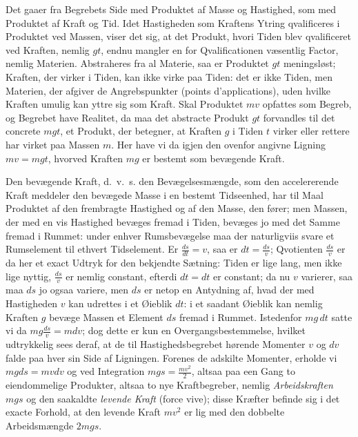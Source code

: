 \documentclass[12pt]{book}
\newcommand{\opage}[1]{\marginnote{\footnotesize\textit{[#1]}}}
\begin{document}
Det gaaer fra Begrebets Side med Produktet af Masse og Hastighed, som med Produktet af
Kraft og Tid. Idet Hastigheden som Kraftens Ytring qvalificeres i Produktet ved Massen,
viser det sig, at det Produkt, hvori Tiden blev
\opage{352} qvalificeret ved Kraften, nemlig $gt$, endnu mangler en for Qvalificationen væsentlig
Factor, nemlig Materien. Abstraheres fra al Materie, saa er Produktet $gt$ meningsløst;
Kraften, der virker i Tiden, kan ikke virke paa Tiden: det er ikke Tiden, men Materien,
der afgiver de Angrebspunkter (points d'applications), uden hvilke Kraften umulig kan
yttre sig som Kraft. Skal Produktet $mv$ opfattes som Begreb, og Begrebet have Realitet,
da maa det abstracte Produkt $gt$ forvandles til det concrete $mgt$, et Produkt, der
betegner, at Kraften $g$ i Tiden $t$ virker eller rettere har virket paa Massen $m$. Her
have vi da igjen den ovenfor angivne Ligning $mv = mgt$, hvorved Kraften $mg$ er bestemt
som bevægende Kraft.

Den bevægende Kraft, d.\ v.\ s. den Bevægelsesmængde, som den accelererende Kraft meddeler
den bevægede Masse i en bestemt Tidseenhed, har til Maal Produktet af den frembragte
Hastighed og af den Masse, den fører; men Massen, der med en vis Hastighed bevæges fremad
i Tiden, bevæges jo med det Samme fremad i Rummet: under enhver Rumsbevægelse maa der
naturligviis svare et Rumselement til ethvert Tidselement. Er $\frac{ds}{dt} = v$, saa er
$dt = \frac{ds}{v}$; Qvotienten $\frac{ds}{v}$ er da her et exact Udtryk for den bekjendte
Sætning: Tiden er lige lang, men ikke lige nyttig, $\frac{ds}{v}$ er nemlig constant,
efterdi $dt = dt$ er constant; da nu $v$ varierer, saa maa $ds$ jo ogsaa variere, men $ds$
er netop en Antydning af, hvad der med Hastigheden $v$ kan udrettes i et Øieblik $dt$: i et
saadant Øieblik kan nemlig Kraften $g$ bevæge Massen et Element $ds$ fremad i Rummet.
Istedenfor $mg\,dt$ satte vi da $mg\frac{ds}{v} = mdv$; dog dette er kun en
Overgangsbestemmelse, hvilket udtrykkelig sees deraf, at de til
\opage{353} Hastighedsbegrebet hørende Momenter $v$ og $dv$ falde paa hver sin Side af Ligningen.
Forenes de adskilte Momenter, erholde vi $mgds = mvdv$ og ved Integration
$mgs = \frac{mv^{2}}{2}$, altsaa paa een Gang to eiendommelige Produkter, altsaa to nye
Kraftbegreber, nemlig \emph{Arbeidskraften} $mgs$ og den saakaldte \emph{levende Kraft}
(force vive); disse Kræfter befinde sig i det exacte Forhold, at den levende Kraft $mv^{2}$
er lig med den dobbelte Arbeidsmængde $2mgs$.
\end{document}
